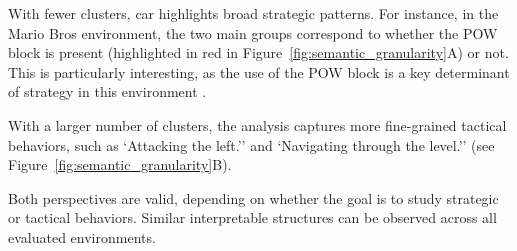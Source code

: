 With fewer clusters, \gls{car} highlights broad strategic patterns.
For instance, in the Mario Bros environment, the two main groups correspond to whether the POW block is present (highlighted in red in Figure~\ref{fig:semantic_granularity}A) or not.
This is particularly interesting, as the use of the POW block is a key determinant of strategy in this environment \cite{mario_bros_atari_2600}.

With a larger number of clusters, the analysis captures more fine-grained tactical behaviors, such as `Attacking the left.'' and `Navigating through the level.'' (see Figure~\ref{fig:semantic_granularity}B).

Both perspectives are valid, depending on whether the goal is to study strategic or tactical behaviors.
Similar interpretable structures can be observed across all evaluated environments.
